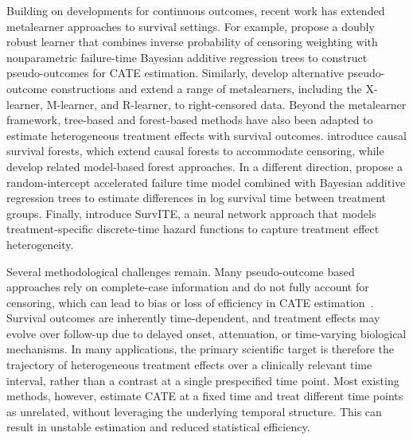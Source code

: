 \documentclass{article}
\begin{document}
{ Building on developments for continuous outcomes, recent work has extended metalearner approaches to survival settings. For example, \cite{yang2025doubly} propose a doubly robust learner that combines inverse probability of censoring weighting with nonparametric failure-time Bayesian additive regression trees to construct pseudo-outcomes for CATE estimation. Similarly, \cite{bo2025evaluating} develop alternative pseudo-outcome constructions and extend a range of metalearners, including the X-learner, M-learner, and R-learner, to right-censored data.   Beyond the metalearner framework, tree-based and forest-based methods have also been adapted to estimate heterogeneous treatment effects with survival outcomes. \cite{cui2023estimating} introduce causal survival forests, which extend causal forests to accommodate censoring, while \cite{dandl2024heterogeneous} develop related model-based forest approaches. In a different direction, \cite{hu2024new} propose a random-intercept accelerated failure time model combined with Bayesian additive regression trees to estimate differences in log survival time between treatment groups. Finally, \cite{curth2021survite} introduce SurvITE, a neural network approach that models treatment-specific discrete-time hazard functions to capture treatment effect heterogeneity.}

{ Several methodological challenges remain. Many pseudo-outcome based approaches rely on complete-case information and do not fully account for censoring, which can lead to bias or loss of efficiency in CATE estimation~\citep{xu2023treatment}.   Survival outcomes are inherently time-dependent, and treatment effects may evolve over follow-up due to delayed onset, attenuation, or time-varying biological mechanisms. In many applications, the primary scientific target is therefore the trajectory of heterogeneous treatment effects over a clinically relevant time interval, rather than a contrast at a single prespecified time point.   Most existing methods, however, estimate CATE at a fixed time and treat different time points as unrelated, without leveraging the underlying temporal structure. This can result in unstable estimation and reduced statistical efficiency.}
 
\end{document}
